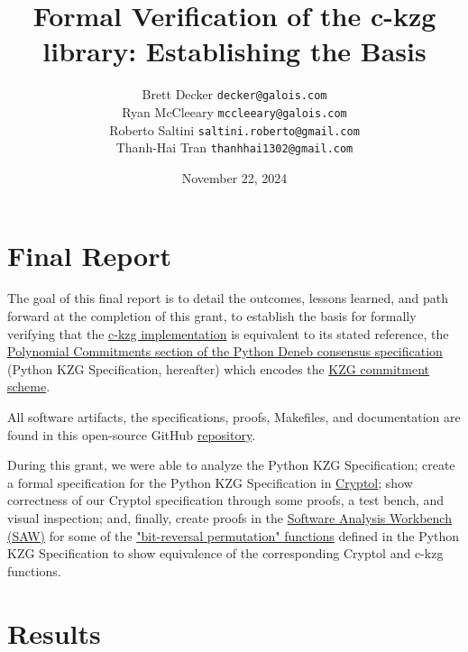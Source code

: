 \documentclass[12pt]{galois-whitepaper}
\author{Brett Decker \texttt{decker@galois.com}\\
Ryan McCleeary \texttt{mccleeary@galois.com}\\
Roberto Saltini \texttt{saltini.roberto@gmail.com}\\
Thanh-Hai Tran \texttt{thanhhai1302@gmail.com}
}
\title{Formal Verification of the c-kzg library: Establishing the Basis}
\date{November 22, 2024}
\begin{document}
\maketitle

\vspace*{2cm}

\newpage
\tableofcontents
\newpage

\section{Final Report}
The goal of this final report is to detail the outcomes, lessons learned, and path forward at the completion of this grant, to establish the basis for formally verifying that
the \href{https://github.com/ethereum/c-kzg-4844}{c-kzg implementation} is equivalent to its stated reference,
the \href{https://github.com/ethereum/consensus-specs/blob/68d32accf945a84f69d4c779cb6c71223a311eac/specs/deneb/polynomial-commitments.md}{Polynomial Commitments section of the Python Deneb consensus specification} (Python KZG Specification, hereafter) which encodes the \href{https://www.iacr.org/archive/asiacrypt2010/6477178/6477178.pdf}{KZG commitment scheme}.

All software artifacts, the specifications, proofs, Makefiles, and documentation are found in this open-source GitHub \href{https://github.com/GaloisInc/ckzg-eip-4844-verification}{repository}.

During this grant, we were able to analyze the Python KZG Specification; create a formal specification
for the Python KZG Specification in \href{https://cryptol.net}{Cryptol}; show correctness of our Cryptol
specification through some proofs, a test bench, and visual inspection; and, finally, create proofs in
the \href{https://saw.galois.com}{Software Analysis Workbench (SAW)} for some of the
\href{https://github.com/ethereum/consensus-specs/blob/68d32accf945a84f69d4c779cb6c71223a311eac/specs/deneb/polynomial-commitments.md\#bit-reversal-permutation}
{"bit-reversal permutation" functions} defined in the Python KZG Specification to show equivalence of
the corresponding Cryptol and c-kzg functions.

\section{Results}
\end{document}
